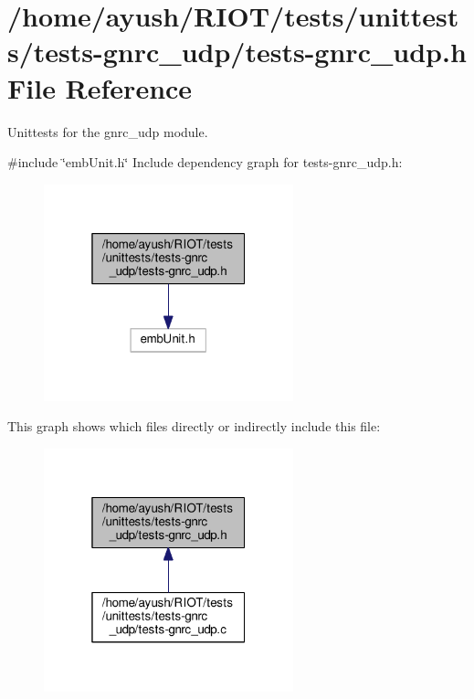 \hypertarget{tests-gnrc__udp_8h}{}\section{/home/ayush/\+R\+I\+O\+T/tests/unittests/tests-\/gnrc\+\_\+udp/tests-\/gnrc\+\_\+udp.h File Reference}
\label{tests-gnrc__udp_8h}


Unittests for the {\ttfamily gnrc\+\_\+udp} module.  


{\ttfamily \#include \char`\"{}emb\+Unit.\+h\char`\"{}}\newline
Include dependency graph for tests-\/gnrc\+\_\+udp.h\+:
\nopagebreak
\begin{figure}[H]
\begin{center}
\leavevmode
\includegraphics[width=205pt]{tests-gnrc__udp_8h__incl}
\end{center}
\end{figure}
This graph shows which files directly or indirectly include this file\+:
\nopagebreak
\begin{figure}[H]
\begin{center}
\leavevmode
\includegraphics[width=205pt]{tests-gnrc__udp_8h__dep__incl}
\end{center}
\end{figure}
